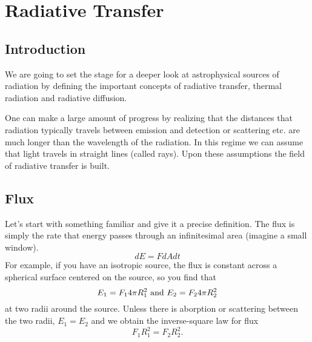 \chapter{Radiative Transfer}
\label{cha:radiative-transfer}

\section{Introduction}
\label{sec:introduction}

We are going to set the stage for a deeper look at astrophysical
sources of radiation by defining the important concepts of radiative
transfer, thermal radiation and radiative diffusion.

One can make a large amount of progress by realizing that the
distances that radiation typically travels between emission and
detection or scattering etc. are much longer than the wavelength of
the radiation.  In this regime we can assume that light travels in
straight lines (called rays).  Upon these assumptions the field of
radiative transfer is built.

\section{Flux}
\label{sec:flux}
Let's start with something familiar and give it a precise definition.
The flux is simply the rate that energy passes through an
infinitesimal area (imagine a small window).
\begin{equation}
dE = F d\!A dt
\label{eq:1}
\end{equation}
For example, if you have an isotropic source, 
the flux is constant across a spherical surface centered on the
source, so you find that
\begin{equation}
E_1=F_1 4 \pi R_1^2 ~\mbox{\rm and}~
E_2=F_2 4 \pi R_2^2 
\label{eq:2}
\end{equation}
at two radii around the source.   Unless there is aborption or scattering 
between the two radii, $E_1=E_2$ and we obtain the inverse-square law 
for flux
\begin{equation}
F_1 R_1^2 = F_2 R_2^2.
\label{eq:3}
\end{equation}

